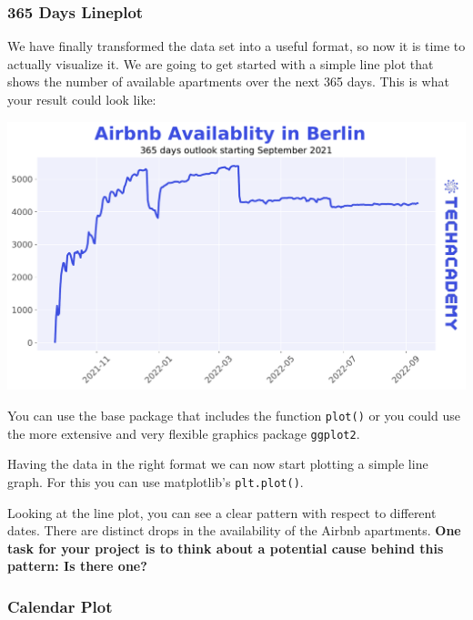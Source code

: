 \documentclass[
  11pt,
]{article}
\newenvironment{tips}[1]
  {
  \begin{itemize}
  \footnotesize
  \renewcommand{\labelitemi}{
    \raisebox{-.7\height}[0pt][0pt]{
      {\setkeys{Gin}{width=3em,keepaspectratio}
        \texttt{[image: images/\#1.png]}}
    }
  }
  \setlength{\fboxsep}{1em}
  \begin{rbox}
  \item
  }
  {
  \end{rbox}
  \end{itemize}
  }
\newenvironment{tipsp}[1]
  {
  \begin{itemize}
  \footnotesize
  \renewcommand{\labelitemi}{
    \raisebox{-.7\height}[0pt][0pt]{
      {\setkeys{Gin}{width=3em,keepaspectratio}
        \texttt{[image: images/\#1.png]}}
    }
  }
  \setlength{\fboxsep}{1em}
  \begin{pbox}
  \item
  }
  {
  \end{pbox}
  \end{itemize}
  }
\begin{document}
\hypertarget{days-lineplot}{%
\subsubsection{365 Days Lineplot}\label{days-lineplot}}

We have finally transformed the data set into a useful format, so now it is time to actually visualize it. We are going to get started with a simple line plot that shows the number of available apartments over the next 365 days. This is what your result could look like:

\begin{center}\includegraphics[width=1\linewidth]{plot/01_python/availability} \end{center}

\begin{tips}r
You can use the base package that includes the function \texttt{plot()} or you could use the more extensive and very flexible graphics package \texttt{ggplot2}.

\end{tips}

\begin{tipsp}p
Having the data in the right format we can now start plotting a simple line graph. For this you can use matplotlib's \texttt{plt.plot()}.

\end{tipsp}

Looking at the line plot, you can see a clear pattern with respect to different dates. There are distinct drops in the availability of the Airbnb apartments. \textbf{One task for your project is to think about a potential cause behind this pattern: Is there one?}

\hypertarget{calendar-plot}{%
\subsubsection{Calendar Plot}\label{calendar-plot}}
\end{document}
